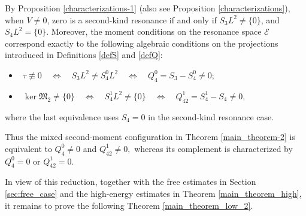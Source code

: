 \documentclass[reqno]{amsart}
\numberwithin{equation}{section}
\begin{document}
By Proposition \ref{characterizations-1} (also see Proposition \ref{characterizations}), when $V\neq0$, zero is a
second-kind resonance if and only if
$
S_3L^2\neq\{0\}$, and $
S_4L^2=\{0\}.
$
Moreover, the moment conditions on the resonance space
$\mathcal E$ correspond exactly to the following algebraic
conditions on the projections introduced in Definitions \ref{defS} and \ref{defQ}:
\begin{itemize}
\item 
$\ \ \tau\not\equiv0
\quad\Longleftrightarrow\quad
S_3L^2\neq S_4^0L^2
\quad\Longleftrightarrow\quad
Q_4^0=S_3-S_4^0\neq0;
$
\vskip0.2cm
\item $
\ \ \ker\mathfrak M_2\neq\{0\}
\quad\Longleftrightarrow\quad
S_4^1L^2\neq\{0\}
\quad\Longleftrightarrow\quad
Q_{42}^1=S_4^1-S_4\neq0,
$
\end{itemize}
where the last equivalence uses $S_4=0$ in the second-kind
resonance case.

Thus the mixed second-moment configuration in
Theorem \ref{main_theorem-2} is equivalent to
$
Q_4^0\neq0$ and
$Q_{42}^1\neq0,
$
whereas its complement is characterized by
$
Q_4^0=0$ or
$Q_{42}^1=0.
$


In view of this reduction, together with the free estimates in
Section \ref{sec:free_case} and the high-energy estimates in
Theorem \ref{main_theorem_high}, it remains to prove the following
Theorem \ref{main_theorem_low_2}.
\end{document}
